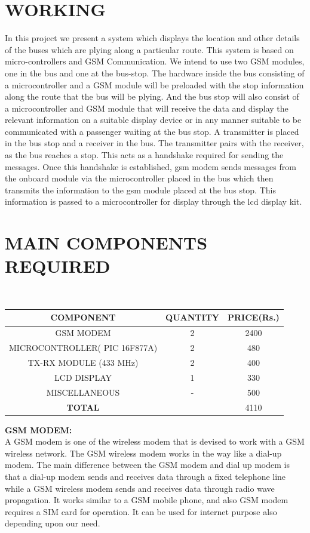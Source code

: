 \documentclass[12pt,a4paper,oneside]{report}
\begin{document}
\begin{onehalfspacing}
\newpage
\section{WORKING}
\par
\hspace{.7cm}
In this project we present a system which displays the location and other details of the buses which are plying along a particular route. This system is based on micro-controllers and GSM Communication. We intend to use two GSM modules, one in the bus and one at the bus-stop. The hardware inside the bus consisting of a microcontroller and a GSM module will be preloaded with the stop information along the route that the bus will be plying. And the bus stop will also consist of a microcontroller and GSM module that will receive the data and display the relevant information on a suitable display device or in any manner suitable to be communicated with a passenger waiting at the bus stop.
   A transmitter is placed in the bus stop and a receiver in the bus. The transmitter pairs with the receiver, as the bus reaches a stop. This acts as a handshake required for sending the messages. Once this handshake is established, gsm modem sends messages from the onboard module via the microcontroller placed in the bus which then transmits the information to the gsm module placed at the bus stop. This information is passed to a microcontroller for display through the lcd display kit. 

\newpage
\section{MAIN COMPONENTS REQUIRED}
{$\;\;\;\;$}	
\begin{table}[h]
\begin{tabular}{|c|c|c|}
\hline
\textbf{COMPONENT} & \textbf{QUANTITY} & \textbf{PRICE(Rs.)}\\
\hline
GSM MODEM & 2 & 2400\\
MICROCONTROLLER( PIC 16F877A) & 2 & 480\\
TX-RX MODULE (433 MHz) & 2 & 400\\
LCD DISPLAY & 1 & 330\\
MISCELLANEOUS	& - & 500\\
\hline
\textbf{TOTAL}	& & 4110\\
\hline

\end{tabular}
\end{table}

\textbf{GSM MODEM:}\\
A GSM modem is one of the wireless modem that is devised to work with a GSM wireless network. The GSM wireless modem works in the way like a dial-up modem. The main difference between the GSM modem and dial up modem is that a dial-up modem sends and receives data through a fixed telephone line while a GSM wireless modem sends and receives data through radio wave propagation.  It works similar to a GSM mobile phone, and also GSM modem requires a SIM card for operation. It can be used for internet purpose also depending upon our need.\\


\end{onehalfspacing}
\end{document}
